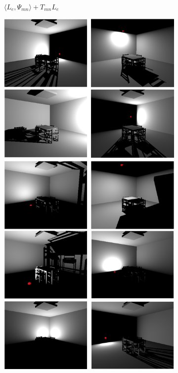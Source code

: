 \begin{figure}
\begin{fullwidth}
\begin{subfigure}[b]{0.38\thewidth}
		\caption{$\langle L_e,\Psi_{mn} \rangle+T_{mn}L_e$}
	\end{subfigure}
	\begin{subfigure}[b]{0.37\thewidth}
		\includegraphics[width=1.0\textwidth]{figures/ir/ir-1-2}

\end{subfigure}
\end{fullwidth}
\end{figure}
